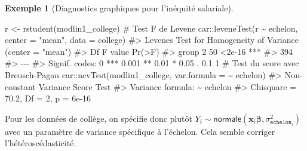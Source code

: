 \documentclass[
  11pt,
  letterpaper,
]{scrbook}
\newenvironment{Shaded}{\begin{snugshade}}{\end{snugshade}}
\newcommand{\AttributeTok}[1]{\textcolor[rgb]{0.40,0.45,0.13}{#1}}
\newcommand{\CommentTok}[1]{\textcolor[rgb]{0.37,0.37,0.37}{#1}}
\newcommand{\FunctionTok}[1]{\textcolor[rgb]{0.28,0.35,0.67}{#1}}
\newcommand{\NormalTok}[1]{\textcolor[rgb]{0.00,0.23,0.31}{#1}}
\newcommand{\OtherTok}[1]{\textcolor[rgb]{0.00,0.23,0.31}{#1}}
\newcommand{\SpecialCharTok}[1]{\textcolor[rgb]{0.37,0.37,0.37}{#1}}
\newcommand{\StringTok}[1]{\textcolor[rgb]{0.13,0.47,0.30}{#1}}
\theoremstyle{plain}
\theoremstyle{plain}
\theoremstyle{definition}
\newtheorem{example}{Exemple}[chapter]
\theoremstyle{definition}
\theoremstyle{remark}
\begin{document}
\begin{example}[Diagnostics graphiques pour l'inéquité
salariale]
\begin{Shaded}
\begin{Highlighting}[]
\NormalTok{r }\OtherTok{\textless{}{-}} \FunctionTok{rstudent}\NormalTok{(modlin1\_college)}
\CommentTok{\# Test F de Levene}
\NormalTok{car}\SpecialCharTok{::}\FunctionTok{leveneTest}\NormalTok{(r }\SpecialCharTok{\textasciitilde{}}\NormalTok{ echelon, }\AttributeTok{center =} \StringTok{"mean"}\NormalTok{, }\AttributeTok{data =}\NormalTok{ college)}
\CommentTok{\#\textgreater{} Levene\textquotesingle{}s Test for Homogeneity of Variance (center = "mean")}
\CommentTok{\#\textgreater{}        Df F value Pr(\textgreater{}F)    }
\CommentTok{\#\textgreater{} group   2      50 \textless{}2e{-}16 ***}
\CommentTok{\#\textgreater{}       394                   }
\CommentTok{\#\textgreater{} {-}{-}{-}}
\CommentTok{\#\textgreater{} Signif. codes:  0 \textquotesingle{}***\textquotesingle{} 0.001 \textquotesingle{}**\textquotesingle{} 0.01 \textquotesingle{}*\textquotesingle{} 0.05 \textquotesingle{}.\textquotesingle{} 0.1 \textquotesingle{} \textquotesingle{} 1}
\CommentTok{\# Test du score avec Breusch{-}Pagan}
\NormalTok{car}\SpecialCharTok{::}\FunctionTok{ncvTest}\NormalTok{(modlin1\_college, }\AttributeTok{var.formula =}  \SpecialCharTok{\textasciitilde{}}\NormalTok{ echelon)}
\CommentTok{\#\textgreater{} Non{-}constant Variance Score Test }
\CommentTok{\#\textgreater{} Variance formula: \textasciitilde{} echelon }
\CommentTok{\#\textgreater{} Chisquare = 70.2, Df = 2, p = 6e{-}16}
\end{Highlighting}
\end{Shaded}

Pour les données de collège, on spécifie donc plutôt
\(Y_i \sim \mathsf{normale}(\mathbf{x}_i\boldsymbol{\beta}, \sigma^2_{\texttt{echelon}_i})\)
avec un paramètre de variance spécifique à l'échelon. Cela semble
corriger l'hétéroscédasticité.


\end{example}
\end{document}
